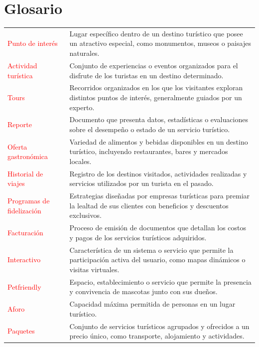 \chapter{Glosario}


\begin{center}
\begin{tabular}{p{4cm} p{11cm}}
    \textcolor{red}{Punto de interés} & Lugar específico dentro de un destino turístico que posee un atractivo especial, como monumentos, museos o paisajes naturales. \\
    \textcolor{red}{Actividad turística} & Conjunto de experiencias o eventos organizados para el disfrute de los turistas en un destino determinado. \\
    \textcolor{red}{Tours} & Recorridos organizados en los que los visitantes exploran distintos puntos de interés, generalmente guiados por un experto. \\
    \textcolor{red}{Reporte} & Documento que presenta datos, estadísticas o evaluaciones sobre el desempeño o estado de un servicio turístico. \\
    \textcolor{red}{Oferta gastronómica} & Variedad de alimentos y bebidas disponibles en un destino turístico, incluyendo restaurantes, bares y mercados locales. \\
    \textcolor{red}{Historial de viajes} & Registro de los destinos visitados, actividades realizadas y servicios utilizados por un turista en el pasado. \\
    \textcolor{red}{Programas de fidelización} & Estrategias diseñadas por empresas turísticas para premiar la lealtad de sus clientes con beneficios y descuentos exclusivos. \\
    \textcolor{red}{Facturación} & Proceso de emisión de documentos que detallan los costos y pagos de los servicios turísticos adquiridos. \\
    \textcolor{red}{Interactivo} & Característica de un sistema o servicio que permite la participación activa del usuario, como mapas dinámicos o visitas virtuales. \\
    \textcolor{red}{Petfriendly} & Espacio, establecimiento o servicio que permite la presencia y convivencia de mascotas junto con sus dueños. \\
    \textcolor{red}{Aforo} & Capacidad máxima permitida de personas en un lugar turístico. \\
    \textcolor{red}{Paquetes} & Conjunto de servicios turísticos agrupados y ofrecidos a un precio único, como transporte, alojamiento y actividades. \\
    
\end{tabular}
\end{center}


